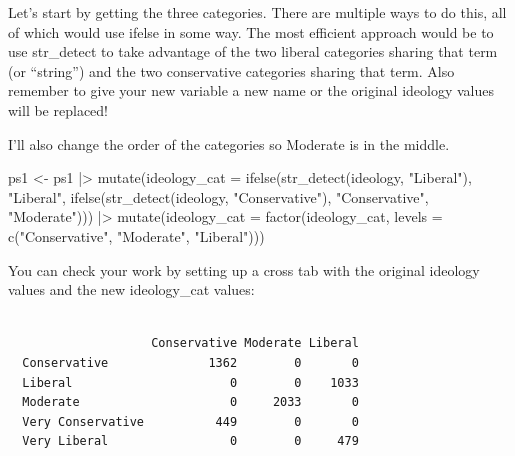 \documentclass[
  letterpaper,
  DIV=11,
  numbers=noendperiod]{scrartcl}
\newenvironment{Shaded}{\begin{snugshade}}{\end{snugshade}}
\newcommand{\AttributeTok}[1]{\textcolor[rgb]{0.40,0.45,0.13}{#1}}
\newcommand{\FunctionTok}[1]{\textcolor[rgb]{0.28,0.35,0.67}{#1}}
\newcommand{\NormalTok}[1]{\textcolor[rgb]{0.00,0.23,0.31}{#1}}
\newcommand{\OtherTok}[1]{\textcolor[rgb]{0.00,0.23,0.31}{#1}}
\newcommand{\SpecialCharTok}[1]{\textcolor[rgb]{0.37,0.37,0.37}{#1}}
\newcommand{\StringTok}[1]{\textcolor[rgb]{0.13,0.47,0.30}{#1}}
\begin{document}
Let's start by getting the three categories. There are multiple ways to
do this, all of which would use ifelse in some way. The most efficient
approach would be to use str\_detect to take advantage of the two
liberal categories sharing that term (or ``string'') and the two
conservative categories sharing that term. Also remember to give your
new variable a new name or the original ideology values will be
replaced!

I'll also change the order of the categories so Moderate is in the
middle.

\begin{Shaded}
\begin{Highlighting}[]
\NormalTok{ps1 }\OtherTok{\textless{}{-}}\NormalTok{ ps1 }\SpecialCharTok{|\textgreater{}} 
  \FunctionTok{mutate}\NormalTok{(}\AttributeTok{ideology\_cat =} \FunctionTok{ifelse}\NormalTok{(}\FunctionTok{str\_detect}\NormalTok{(ideology, }\StringTok{"Liberal"}\NormalTok{), }
                               \StringTok{"Liberal"}\NormalTok{,}
                               \FunctionTok{ifelse}\NormalTok{(}\FunctionTok{str\_detect}\NormalTok{(ideology, }
                                                 \StringTok{"Conservative"}\NormalTok{),}
                                      \StringTok{"Conservative"}\NormalTok{, }
                                      \StringTok{"Moderate"}\NormalTok{))) }\SpecialCharTok{|\textgreater{}} 
  \FunctionTok{mutate}\NormalTok{(}\AttributeTok{ideology\_cat =} \FunctionTok{factor}\NormalTok{(ideology\_cat,}
                               \AttributeTok{levels =} \FunctionTok{c}\NormalTok{(}\StringTok{"Conservative"}\NormalTok{,}
                                          \StringTok{"Moderate"}\NormalTok{,}
                                          \StringTok{"Liberal"}\NormalTok{)))}
\end{Highlighting}
\end{Shaded}

You can check your work by setting up a cross tab with the original
ideology values and the new ideology\_cat values:

\begin{Shaded}
\end{Shaded}

\begin{verbatim}
                   
                    Conservative Moderate Liberal
  Conservative              1362        0       0
  Liberal                      0        0    1033
  Moderate                     0     2033       0
  Very Conservative          449        0       0
  Very Liberal                 0        0     479
\end{verbatim}
\end{document}
